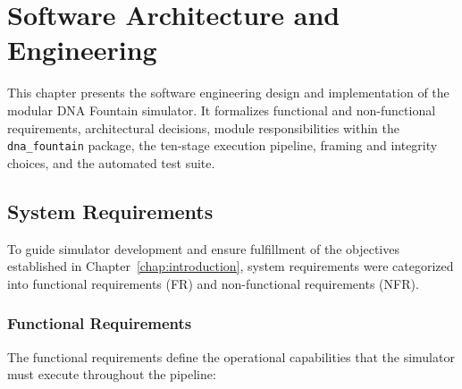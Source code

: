 \chapter{Software Architecture and Engineering}
\label{chap:software_architecture}

This chapter presents the software engineering design and implementation of the modular DNA Fountain simulator. It formalizes functional and non-functional requirements, architectural decisions, module responsibilities within the \texttt{dna\_fountain} package, the ten-stage execution pipeline, framing and integrity choices, and the automated test suite.

\section{System Requirements}
\label{sec:system_requirements}

To guide simulator development and ensure fulfillment of the objectives established in Chapter~\ref{chap:introduction}, system requirements were categorized into functional requirements (FR) and non-functional requirements (NFR).

\subsection{Functional Requirements}

The functional requirements define the operational capabilities that the simulator must execute throughout the pipeline:

